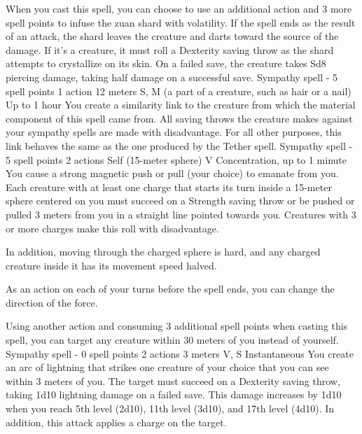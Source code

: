     When you cast this spell, you can choose to use an additional action and 3 more spell points to infuse the zuan shard with volatility.
    If the spell ends as the result of an attack, the shard leaves the creature and darts toward the source of the damage.
    If it's a creature, it must roll a Dexterity saving throw as the shard attempts to crystallize on its skin.
    On a failed save, the creature takes Sd8 piercing damage, taking half damage on a successful save.
    {Sympathy spell - 5 spell points}
    {1 action}
    {12 meters}
    {S, M (a part of a creature, such as hair or a nail)}
    {Up to 1 hour}
    You create a similarity link to the creature from which the material component of this spell came from.
    All saving throws the creature makes against your sympathy spells are made with disadvantage.
    For all other purposes, this link behaves the same as the one produced by the Tether spell.
    {Sympathy spell - 5 spell points}
    {2 actions}
    {Self (15-meter sphere)}
    {V}
    {Concentration, up to 1 minute}
    You cause a strong magnetic push or pull (your choice) to emanate from you.
    Each creature with at least one charge that starts its turn inside a 15-meter sphere centered on you must succeed on a Strength saving throw or be pushed or pulled 3 meters from you in a straight line pointed towards you.
    Creatures with 3 or more charges make this roll with disadvantage.

    In addition, moving through the charged sphere is hard, and any charged creature inside it has its movement speed halved.

    As an action on each of your turns before the spell ends, you can change the direction of the force.

    Using another action and consuming 3 additional spell points when casting this spell, you can target any creature within 30 meters of you instead of yourself.
    {Sympathy spell - 0 spell points}
    {2 actions}
    {3 meters}
    {V, S}
    {Instantaneous}
    You create an arc of lightning that strikes one creature of your choice that you can see within 3 meters of you.
    The target must succeed on a Dexterity saving throw, taking 1d10 lightning damage on a failed save.
    This damage increases by 1d10 when you reach 5th level (2d10), 11th level (3d10), and 17th level (4d10).
    In addition, this attack applies a charge on the target.

